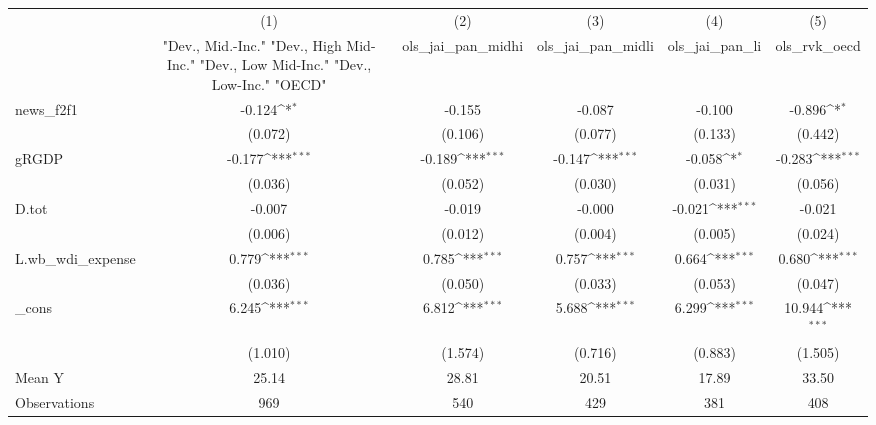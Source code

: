 {
\def\sym#1{\ifmmode^{#1}\else\(^{#1}\)\fi}
\begin{tabular}{l*{5}{c}}
\toprule
            &\multicolumn{1}{c}{(1)}&\multicolumn{1}{c}{(2)}&\multicolumn{1}{c}{(3)}&\multicolumn{1}{c}{(4)}&\multicolumn{1}{c}{(5)}\\
            &\multicolumn{1}{c}{ "Dev., Mid.-Inc." "Dev., High Mid-Inc." "Dev., Low Mid-Inc." "Dev., Low-Inc." "OECD" }&\multicolumn{1}{c}{ols\_jai\_pan\_midhi}&\multicolumn{1}{c}{ols\_jai\_pan\_midli}&\multicolumn{1}{c}{ols\_jai\_pan\_li}&\multicolumn{1}{c}{ols\_rvk\_oecd}\\
\midrule
news\_f2f1   &      -0.124\sym{*}  &      -0.155         &      -0.087         &      -0.100         &      -0.896\sym{*}  \\
            &     (0.072)         &     (0.106)         &     (0.077)         &     (0.133)         &     (0.442)         \\
\addlinespace
gRGDP       &      -0.177\sym{***}&      -0.189\sym{***}&      -0.147\sym{***}&      -0.058\sym{*}  &      -0.283\sym{***}\\
            &     (0.036)         &     (0.052)         &     (0.030)         &     (0.031)         &     (0.056)         \\
\addlinespace
D.tot       &      -0.007         &      -0.019         &      -0.000         &      -0.021\sym{***}&      -0.021         \\
            &     (0.006)         &     (0.012)         &     (0.004)         &     (0.005)         &     (0.024)         \\
\addlinespace
L.wb\_wdi\_expense&       0.779\sym{***}&       0.785\sym{***}&       0.757\sym{***}&       0.664\sym{***}&       0.680\sym{***}\\
            &     (0.036)         &     (0.050)         &     (0.033)         &     (0.053)         &     (0.047)         \\
\addlinespace
\_cons      &       6.245\sym{***}&       6.812\sym{***}&       5.688\sym{***}&       6.299\sym{***}&      10.944\sym{***}\\
            &     (1.010)         &     (1.574)         &     (0.716)         &     (0.883)         &     (1.505)         \\
\midrule
Mean Y      &       25.14         &       28.81         &       20.51         &       17.89         &       33.50         \\
Observations&         969         &         540         &         429         &         381         &         408         \\
\bottomrule
\end{tabular}
}
